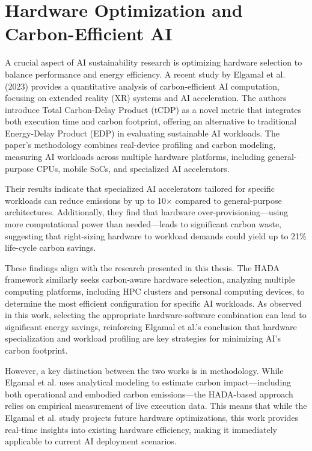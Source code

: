 \documentclass[a4paper,singleside,12pt]{report} %
\begin{document}
\section{Hardware Optimization and Carbon-Efficient AI}

A crucial aspect of AI sustainability research is optimizing hardware selection to balance performance and energy efficiency. 
A recent study by Elgamal et al. (2023) \cite{elgamal2023carbon} provides a quantitative analysis of carbon-efficient AI computation, 
focusing on extended reality (XR) systems and AI acceleration. The authors introduce Total Carbon-Delay Product (tCDP) as a 
novel metric that integrates both execution time and carbon footprint, offering an alternative to traditional Energy-Delay Product (EDP) 
in evaluating sustainable AI workloads. The paper's methodology combines real-device profiling and carbon modeling, measuring 
AI workloads across multiple hardware platforms, including general-purpose CPUs, mobile SoCs, and specialized AI accelerators.

Their results indicate that specialized AI accelerators tailored for specific workloads can reduce emissions by up to 10× compared 
to general-purpose architectures. Additionally, they find that hardware over-provisioning—using more computational power than needed—leads 
to significant carbon waste, suggesting that right-sizing hardware to workload demands could yield up to 21\% life-cycle carbon savings.

These findings align with the research presented in this thesis. The HADA framework similarly seeks carbon-aware hardware selection, 
analyzing multiple computing platforms, including HPC clusters and personal computing devices, to determine the most efficient configuration 
for specific AI workloads. As observed in this work, selecting the appropriate hardware-software combination can lead to significant energy 
savings, reinforcing Elgamal et al.'s conclusion that hardware specialization and workload profiling are key strategies for minimizing AI's 
carbon footprint.

However, a key distinction between the two works is in methodology. While Elgamal et al. uses analytical modeling to estimate carbon 
impact—including both operational and embodied carbon emissions—the HADA-based approach relies on empirical measurement of live execution 
data. This means that while the Elgamal et al. study projects future hardware optimizations, this work provides real-time insights into existing 
hardware efficiency, making it immediately applicable to current AI deployment scenarios.
\end{document}
